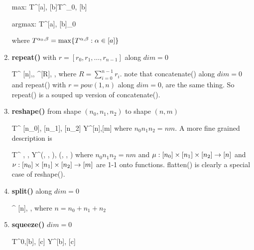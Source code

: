 \begin{enumerate}
\beq
{\rm max:}\;\; T^{[a], [b]}\rarrow T^{\alp_0, [b]}
\eeq

\beq
{\rm argmax:}\;\; T^{[a], [b]}\rarrow \alp_0
\eeq

where $T^{\alpha_0, \beta}=\max\{T^{\alpha, \beta}: \alpha\in[a]\}$



\item {\bf repeat()} with $r=[r_0, r_1, \ldots, r_{n-1}]$
along $dim=0$

\beq
T^{
[n],\beta, \gamma}\rarrow
{}^{[R], \beta, \gamma}
\eeq
where $R=\sum_{i=0}^{n-1}r_i$.
note that concatenate() along $dim=0$ and repeat() 
 with $r=pow(1, n)$
along $dim=0$, are the same thing. So repeat() is a 
souped up version of concatenate().


\item {\bf reshape()} from shape 
$(n_0, n_1, n_2)$ to shape $(n,m)$

\beq
T^{
[n_0],
[n_1],
[n_2]}
\rarrow
Y^{[n],[m]}
\eeq
where
$n_0n_1n_2=nm$. A more fine grained description is

\beq
T^{
\alpha,
\beta,
\gamma}
\rarrow
Y^{\mu(\alpha, \beta, \gamma),
\nu(\alpha, \beta, \gamma)}
\eeq
where $n_0n_1n_2=nm$ and
$\mu:[n_0]\times[n_1]\times[n_2]\rightarrow [n]$
and
$\nu:[n_0]\times[n_1]\times[n_2]\rightarrow [m]$
are 1-1 onto functions.
flatten() is clearly a special case of reshape().


\item {\bf split()} along $dim=0$

\beq
{}^{
[n], \beta, \gamma}
\eeq
where $n= n_0 + n_1 + n_2$




\item {\bf squeeze()} $dim=0$

\beq
T^{0,[b], [c]}
\rarrow
Y^{[b], [c]}
\eeq


\end{enumerate}
